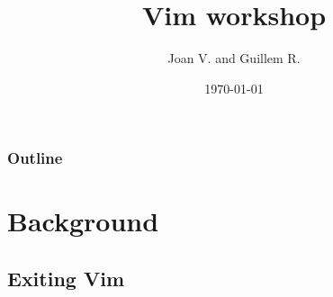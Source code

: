 \documentclass{beamer}
\title[Vim workshop]{Vim workshop}
\author{Joan V. and Guillem R.}
\institute[LinuxUPC]
{
  LinuxUPC \\
  \medskip
  \textit{linuxupc AT linuxupc.upc.edu} 
}
\date{\today}
\begin{document}
\begin{frame}
  \titlepage
\end{frame}

\begin{frame}
  \frametitle{Outline} 
  \tableofcontents 
\end{frame}

\section{Background}
\subsection{Exiting Vim}
\end{document}
